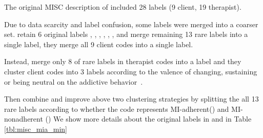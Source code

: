  The original MISC description of
\citet{miller2003manual} included 28 labels (9 client, 19
therapist).

 Due to data scarcity and label confusion, some
labels were merged into a coarser set.  \citet{can2015dialog} retain 6
original labels \FA, \GI, \QUC, \QUO, \REC, \RES, and merge remaining
13 rare labels into a single  label, they merge all 9 client
codes into a single  label.

 Instead, \citet{tanana2016comparison} merge only 8
of rare labels in therapist codes into a  label and they
cluster client codes into 3 labels according to the valence of
changing, sustaining or being neutral on the addictive
behavior~\cite{atkins2014scaling}.

 Then \citet{xiao2016behavioral} combine and
improve above two clustering strategies by splitting the all 13 rare
labels according to whether the code represents MI-adherent(\MIA) and
MI-nonadherent (\MIN) We show more details about the original labels
in \MIA and \MIN in Table \ref{tbl:misc_mia_min}

